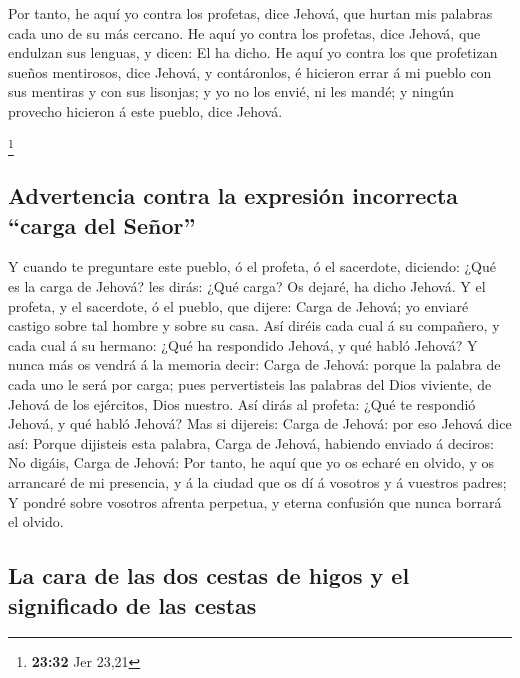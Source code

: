 Por tanto, he aquí yo contra los profetas, dice Jehová,
que hurtan mis palabras cada uno de su más cercano.  He
aquí yo contra los profetas, dice Jehová, que endulzan sus lenguas, y
dicen: El ha dicho.  He aquí yo contra los que profetizan
sueños mentirosos, dice Jehová, y contáronlos, é hicieron errar á mi
pueblo con sus mentiras y con sus lisonjas; y yo no los envié, ni les
mandé; y ningún provecho hicieron á este pueblo, dice Jehová.

\footnote{\textbf{23:32} Jer 23,21}

\hypertarget{advertencia-contra-la-expresiuxf3n-incorrecta-carga-del-seuxf1or}{%
\subsection{Advertencia contra la expresión incorrecta ``carga del
Señor''}\label{advertencia-contra-la-expresiuxf3n-incorrecta-carga-del-seuxf1or}}

 Y cuando te preguntare este pueblo, ó el profeta, ó el
sacerdote, diciendo: ¿Qué es la carga de Jehová? les dirás: ¿Qué carga?
Os dejaré, ha dicho Jehová.  Y el profeta, y el sacerdote,
ó el pueblo, que dijere: Carga de Jehová; yo enviaré castigo sobre tal
hombre y sobre su casa.  Así diréis cada cual á su
compañero, y cada cual á su hermano: ¿Qué ha respondido Jehová, y qué
habló Jehová?  Y nunca más os vendrá á la memoria decir:
Carga de Jehová: porque la palabra de cada uno le será por carga; pues
pervertisteis las palabras del Dios viviente, de Jehová de los
ejércitos, Dios nuestro.  Así dirás al profeta: ¿Qué te
respondió Jehová, y qué habló Jehová?  Mas si dijereis:
Carga de Jehová: por eso Jehová dice así: Porque dijisteis esta palabra,
Carga de Jehová, habiendo enviado á deciros: No digáis, Carga de Jehová:
 Por tanto, he aquí que yo os echaré en olvido, y os
arrancaré de mi presencia, y á la ciudad que os dí á vosotros y á
vuestros padres;  Y pondré sobre vosotros afrenta perpetua,
y eterna confusión que nunca borrará el olvido.

\hypertarget{la-cara-de-las-dos-cestas-de-higos-y-el-significado-de-las-cestas}{%
\subsection{La cara de las dos cestas de higos y el significado de las
cestas}\label{la-cara-de-las-dos-cestas-de-higos-y-el-significado-de-las-cestas}}

